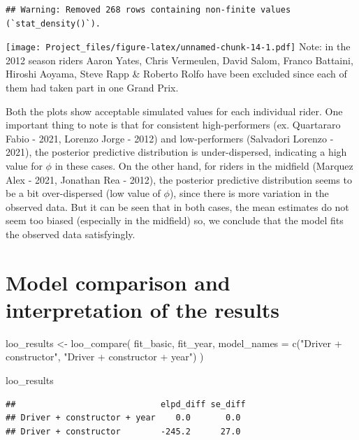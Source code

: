 \documentclass[
]{article}
\newenvironment{Shaded}{\begin{snugshade}}{\end{snugshade}}
\newcommand{\AttributeTok}[1]{\textcolor[rgb]{0.77,0.63,0.00}{#1}}
\newcommand{\FunctionTok}[1]{\textcolor[rgb]{0.00,0.00,0.00}{#1}}
\newcommand{\NormalTok}[1]{#1}
\newcommand{\OtherTok}[1]{\textcolor[rgb]{0.56,0.35,0.01}{#1}}
\newcommand{\StringTok}[1]{\textcolor[rgb]{0.31,0.60,0.02}{#1}}
\begin{document}
\begin{verbatim}
## Warning: Removed 268 rows containing non-finite values (`stat_density()`).
\end{verbatim}

\texttt{[image: Project\_files/figure-latex/unnamed-chunk-14-1.pdf]}
Note: in the 2012 season riders Aaron Yates, Chris Vermeulen, David
Salom, Franco Battaini, Hiroshi Aoyama, Steve Rapp \& Roberto Rolfo have
been excluded since each of them had taken part in one Grand Prix.

Both the plots show acceptable simulated values for each individual
rider. One important thing to note is that for consistent
high-performers (ex. Quartararo Fabio - 2021, Lorenzo Jorge - 2012) and
low-performers (Salvadori Lorenzo - 2021), the posterior predictive
distribution is under-dispersed, indicating a high value for \(\phi\) in
these cases. On the other hand, for riders in the midfield (Marquez Alex
- 2021, Jonathan Rea - 2012), the posterior predictive distribution
seems to be a bit over-dispersed (low value of \(\phi\)), since there is
more variation in the observed data. But it can be seen that in both
cases, the mean estimates do not seem too biased (especially in the
midfield) so, we conclude that the model fits the observed data
satisfyingly.

\hypertarget{model-comparison-and-interpretation-of-the-results}{%
\section{Model comparison and interpretation of the
results}\label{model-comparison-and-interpretation-of-the-results}}

\begin{Shaded}
\begin{Highlighting}[]
\NormalTok{loo\_results }\OtherTok{\textless{}{-}} \FunctionTok{loo\_compare}\NormalTok{(}
\NormalTok{  fit\_basic,}
\NormalTok{  fit\_year,}
  \AttributeTok{model\_names =} \FunctionTok{c}\NormalTok{(}\StringTok{"Driver + constructor"}\NormalTok{, }\StringTok{"Driver + constructor + year"}\NormalTok{)}
\NormalTok{)}

\NormalTok{loo\_results}
\end{Highlighting}
\end{Shaded}

\begin{verbatim}
##                             elpd_diff se_diff
## Driver + constructor + year    0.0       0.0 
## Driver + constructor        -245.2      27.0
\end{verbatim}
\end{document}
